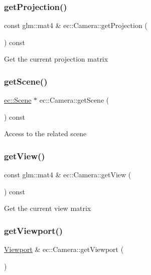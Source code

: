 \subsubsection{\texorpdfstring{get\+Projection()}{getProjection()}}
{\footnotesize\ttfamily const glm\+::mat4 \& ec\+::\+Camera\+::get\+Projection (\begin{DoxyParamCaption}{ }\end{DoxyParamCaption}) const}

Get the current projection matrix \mbox{\label{classec_1_1_camera_a33ad8a16eff39b34db86c6dbf2bbabe4}} 
\subsubsection{\texorpdfstring{get\+Scene()}{getScene()}}
{\footnotesize\ttfamily \mbox{\hyperlink{classec_1_1_scene}{ec\+::\+Scene}} $\ast$ ec\+::\+Camera\+::get\+Scene (\begin{DoxyParamCaption}{ }\end{DoxyParamCaption}) const}

Access to the related scene \mbox{\label{classec_1_1_camera_aa273a9bbe51bc00e8b0a35d8c79b0766}} 
\subsubsection{\texorpdfstring{get\+View()}{getView()}}
{\footnotesize\ttfamily const glm\+::mat4 \& ec\+::\+Camera\+::get\+View (\begin{DoxyParamCaption}{ }\end{DoxyParamCaption}) const}

Get the current view matrix \mbox{\label{classec_1_1_camera_a1f2f4a745112c095d17480959a70eb16}} 
\subsubsection{\texorpdfstring{get\+Viewport()}{getViewport()}\hspace{0.1cm}{\footnotesize\ttfamily [1/2]}}
{\footnotesize\ttfamily \mbox{\hyperlink{classec_1_1_viewport}{Viewport}} \& ec\+::\+Camera\+::get\+Viewport (\begin{DoxyParamCaption}{ }\end{DoxyParamCaption})}

